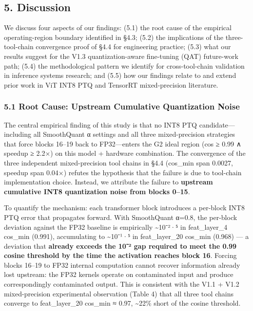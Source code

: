 \documentclass[
]{article}
\begin{document}
\subsection{5. Discussion}\label{discussion}

We discuss four aspects of our findings: (5.1) the root cause of the
empirical operating-region boundary identified in §4.3; (5.2) the
implications of the three-tool-chain convergence proof of §4.4 for
engineering practice; (5.3) what our results suggest for the V1.3
quantization-aware fine-tuning (QAT) future-work path; (5.4) the
methodological pattern we identify for cross-tool-chain validation in
inference systems research; and (5.5) how our findings relate to and
extend prior work in ViT INT8 PTQ and TensorRT mixed-precision
literature.

\subsubsection{5.1 Root Cause: Upstream Cumulative Quantization
Noise}\label{root-cause-upstream-cumulative-quantization-noise}

The central empirical finding of this study is that no INT8 PTQ
candidate---including all SmoothQuant α settings and all three
mixed-precision strategies that force blocks 16--19 back to
FP32---enters the G2 ideal region (cos ≥ 0.99 ∧ speedup ≥ 2.2×) on this
model + hardware combination. The convergence of the three independent
mixed-precision tool chains in §4.4 (cos\_min span 0.0027, speedup span
0.04×) refutes the hypothesis that the failure is due to tool-chain
implementation choice. Instead, we attribute the failure to
\textbf{upstream cumulative INT8 quantization noise from blocks 0--15}.

To quantify the mechanism: each transformer block introduces a per-block
INT8 PTQ error that propagates forward. With SmoothQuant α=0.8, the
per-block deviation against the FP32 baseline is empirically
\textasciitilde10⁻²·⁵ in feat\_layer\_4 cos\_min (0.991), accumulating
to \textasciitilde10⁻¹·⁵ in feat\_layer\_20 cos\_min (0.968) --- a
deviation that \textbf{already exceeds the 10⁻² gap required to meet the
0.99 cosine threshold by the time the activation reaches block 16}.
Forcing blocks 16--19 to FP32 internal computation cannot recover
information already lost upstream: the FP32 kernels operate on
contaminated input and produce correspondingly contaminated output. This
is consistent with the V1.1 + V1.2 mixed-precision experimental
observation (Table 4) that all three tool chains converge to
feat\_layer\_20 cos\_min ≈ 0.97, \textasciitilde22\% short of the cosine
threshold.
\end{document}
